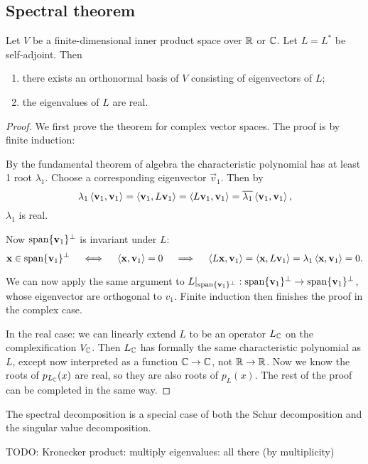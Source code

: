 \subsection{Spectral theorem}
\begin{theorem}
Let $V$ be a finite-dimensional inner product space over $\mathbb{R}$ or $\mathbb{C}$. Let $L=L^*$ be self-adjoint. Then
\begin{enumerate}
\item there exists an orthonormal basis of $V$ consisting of eigenvectors of $L$;
\item the eigenvalues of $L$ are real.
\end{enumerate}
\end{theorem}
\begin{proof}
We first prove the theorem for complex vector spaces. The proof is by finite induction:

By the fundamental theorem of algebra the characteristic polynomial has at least 1 root $\lambda_1$. Choose a corresponding eigenvector $\vec{v}_1$. Then by
\[ \lambda_1\left\langle \bm{\mathrm{v}}_1,\bm{\mathrm{v}}_1 \right\rangle = \left\langle \bm{\mathrm{v}}_1, L\bm{\mathrm{v}}_1 \right\rangle = \left\langle L\bm{\mathrm{v}}_1, \bm{\mathrm{v}}_1 \right\rangle = \overline{\lambda_1}\left\langle \bm{\mathrm{v}}_1, \bm{\mathrm{v}}_1 \right\rangle, \]
$\lambda_1$ is real.

Now $\operatorname{span}\{\bm{\mathrm{v}}_1\}^\perp$ is invariant under $L$:
\[ \bm{\mathrm{x}}\in \operatorname{span}\{\bm{\mathrm{v}}_1\}^\perp \quad\iff\quad \left\langle \bm{\mathrm{x}},\bm{\mathrm{v}}_1 \right\rangle = 0 \quad\implies\quad \left\langle L\bm{\mathrm{x}},\bm{\mathrm{v}}_1 \right\rangle = \left\langle \bm{\mathrm{x}},L\bm{\mathrm{v}}_1 \right\rangle = \lambda_1\left\langle \bm{\mathrm{x}},\bm{\mathrm{v}}_1 \right\rangle = 0. \]

We can now apply the same argument to $L|_{\operatorname{span}\{\bm{\mathrm{v}}_1\}^\perp}:\operatorname{span}\{\bm{\mathrm{v}}_1\}^\perp\to \operatorname{span}\{\bm{\mathrm{v}}_1\}^\perp$, whose eigenvector are orthogonal to $v_1$. Finite induction then finishes the proof in the complex case. 

In the real case: we can linearly extend $L$ to be an operator $L_{\mathbb{C}}$ on the complexification $V_{\mathbb{C}}$. Then $L_{\mathbb{C}}$ has formally the same characteristic polynomial as $L$, except now interpreted as a function $\mathbb{C}\to\mathbb{C}$, not $\mathbb{R}\to\mathbb{R}$. Now we know the roots of $p_{L_{\mathbb{C}}}(x)$ are real, so they are also roots of $p_L(x)$. The rest of the proof can be completed in the same way. 
\end{proof}

The spectral decomposition is a special case of both the Schur decomposition and the singular value decomposition.

TODO: Kronecker product: multiply eigenvalues: all there (by multiplicity)

